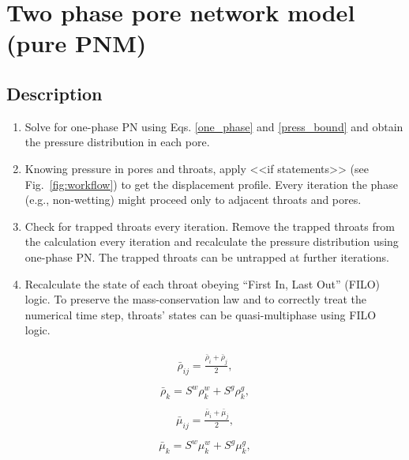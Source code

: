 \documentclass[a4paper,12pt]{extreport}
\begin{document}
 \section*{Two phase pore network model (pure PNM)}
 
 \subsection*{Description} \label{s1}
 \begin{enumerate}
 	\item Solve for one-phase PN using Eqs. \ref{one_phase} and \ref{press_bound} and obtain the pressure distribution in each pore.
 	\item Knowing pressure in pores and throats, apply <<if statements>> (see Fig.~\ref{fig:workflow}) to get the displacement profile. Every iteration the phase (e.g., non-wetting) might proceed only to adjacent throats and pores.
 	\item Check for trapped throats every iteration. Remove the trapped throats from the calculation every iteration and recalculate the pressure distribution using one-phase PN. The trapped throats can be untrapped at further iterations.
 	\item Recalculate the state of each throat obeying “First In, Last Out” (FILO) logic. To preserve the mass-conservation law and to correctly treat the numerical time step, throats' states can be quasi-multiphase using FILO logic.
 \end{enumerate}
 
    \begin{eqnarray}
 	\begin{gathered}
 		\bar{\rho}_{ij} = \frac{\bar{\rho}_i+\bar{\rho}_{j}}{2},
 	\end{gathered}
 \end{eqnarray}
   \begin{eqnarray}
 \begin{gathered}
 \bar{\rho}_{k} = S^w \rho_k^w+ S^g \rho_k^g,
 \end{gathered}
 \end{eqnarray}
 \begin{eqnarray}
 \begin{gathered}
 \bar{\mu}_{ij} = \frac{\bar{\mu}_{i}+\bar{\mu}_{j}}{2},
 \end{gathered}
 \end{eqnarray}
 \begin{eqnarray}
 \begin{gathered}
 \bar{\mu}_{k} = S^w \mu_k^w+ S^g \mu_k^g,
 \end{gathered}
 \end{eqnarray}
\end{document}
